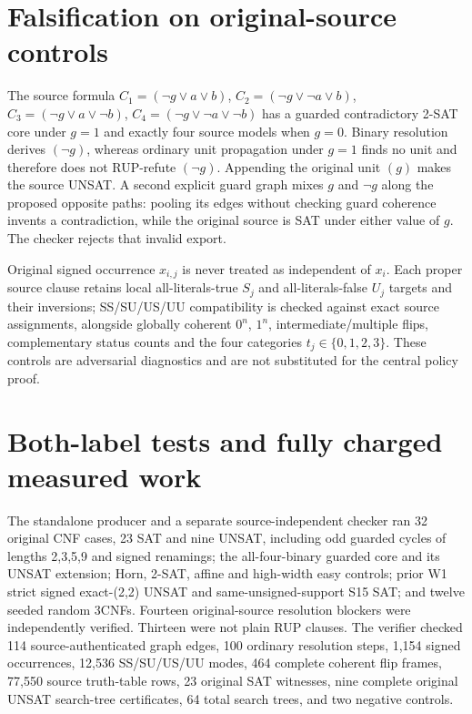 \documentclass[11pt]{article}
\begin{document}
\section{Falsification on original-source controls}
The source formula $C_1=(\neg g\vee a\vee b)$, $C_2=(\neg g\vee\neg a\vee b)$, $C_3=(\neg g\vee a\vee\neg b)$, $C_4=(\neg g\vee\neg a\vee\neg b)$ has a guarded contradictory 2-SAT core under $g=1$ and exactly four source models when $g=0$. Binary resolution derives $(\neg g)$, whereas ordinary unit propagation under $g=1$ finds no unit and therefore does not RUP-refute $(\neg g)$. Appending the original unit $(g)$ makes the source UNSAT. A second explicit guard graph mixes $g$ and $\neg g$ along the proposed opposite paths: pooling its edges without checking guard coherence invents a contradiction, while the original source is SAT under either value of $g$. The checker rejects that invalid export.

Original signed occurrence $x_{i,j}$ is never treated as independent of $x_i$. Each proper source clause retains local all-literals-true $S_j$ and all-literals-false $U_j$ targets and their inversions; SS/SU/US/UU compatibility is checked against exact source assignments, alongside globally coherent $0^n$, $1^n$, intermediate/multiple flips, complementary status counts and the four categories $t_j\in\{0,1,2,3\}$. These controls are adversarial diagnostics and are not substituted for the central policy proof.

\section{Both-label tests and fully charged measured work}
The standalone producer and a separate source-independent checker ran 32 original CNF cases, 23 SAT and nine UNSAT, including odd guarded cycles of lengths 2,3,5,9 and signed renamings; the all-four-binary guarded core and its UNSAT extension; Horn, 2-SAT, affine and high-width easy controls; prior W1 strict signed exact-(2,2) UNSAT and same-unsigned-support S15 SAT; and twelve seeded random 3CNFs. Fourteen original-source resolution blockers were independently verified. Thirteen were not plain RUP clauses. The verifier checked 114 source-authenticated graph edges, 100 ordinary resolution steps, 1,154 signed occurrences, 12,536 SS/SU/US/UU modes, 464 complete coherent flip frames, 77,550 source truth-table rows, 23 original SAT witnesses, nine complete original UNSAT search-tree certificates, 64 total search trees, and two negative controls.
\end{document}
